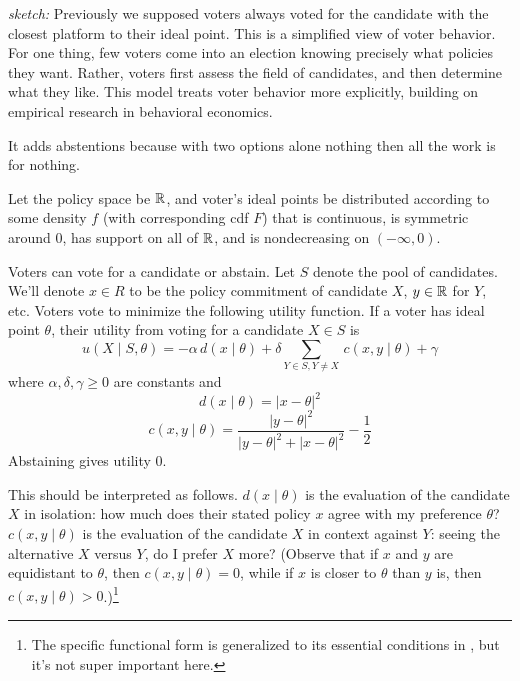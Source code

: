 \documentclass[../../../main.tex]{subfiles}
\begin{document}
\nocite{callander2006context}
\nocite{callander2008context}
\nocite{tversky1993context}

\textit{sketch:}
Previously we supposed voters always voted for the candidate with the closest platform to their ideal point.
This is a simplified view of voter behavior. 
For one thing, few voters come into an election knowing precisely what policies they want.
Rather, voters first assess the field of candidates, and then determine what they like. 
This model treats voter behavior more explicitly, building on empirical research in behavioral economics.

It adds abstentions because with two options alone nothing then all the work is for nothing.

\begin{definition}
    Let the policy space be $\mathbb{R}$, and voter's ideal points be distributed according to some density $f$ (with corresponding cdf $F$) that is continuous, is symmetric around 0, has support on all of $\mathbb{R}$, and is nondecreasing on $(-\infty,0)$.

    Voters can vote for a candidate or abstain. Let $S$ denote the pool of candidates. 
    We'll denote $x\in R$ to be the policy commitment of candidate $X$, $y\in \mathbb{R}$ for $Y$, etc.
    Voters vote to minimize the following utility function.
    If a voter has ideal point $\theta$, their utility from voting for a candidate $X\in S$ is 
    \begin{equation*}
        u(X\mid S, \theta)=-\alpha \, d(x\mid \theta) + \delta \sum_{Y\in S,Y\neq X} \, c(x,y\mid \theta) + \gamma
    \end{equation*}
    where $\alpha,\delta,\gamma\geq 0 $ are constants and
    \begin{equation*}
        d(x\mid \theta) = |x-\theta|^2
    \end{equation*}
    \begin{equation*}
        c(x,y\mid \theta) = \frac{|y-\theta|^2}{|y-\theta|^2+|x-\theta|^2}-\frac{1}{2}
    \end{equation*}
    Abstaining gives utility 0. 

    This should be interpreted as follows. 
    $d(x\mid \theta)$ is the evaluation of the candidate $X$ in isolation: how much does their stated policy $x$ agree with my preference $\theta$?
    $c(x,y\mid \theta)$ is the evaluation of the candidate $X$ in context against $Y$: seeing the alternative $X$ versus $Y$, do I prefer $X$ more?
    (Observe that if $x$ and $y$ are equidistant to $\theta$, then $c(x,y\mid \theta)=0$, while if $x$ is closer to $\theta$ than $y$ is, then $c(x,y\mid \theta)>0$.)\footnote{The specific functional form is generalized to its essential conditions in \cite{callander2008context}, but it's not super important here.}
    

\end{definition}
\end{document}
